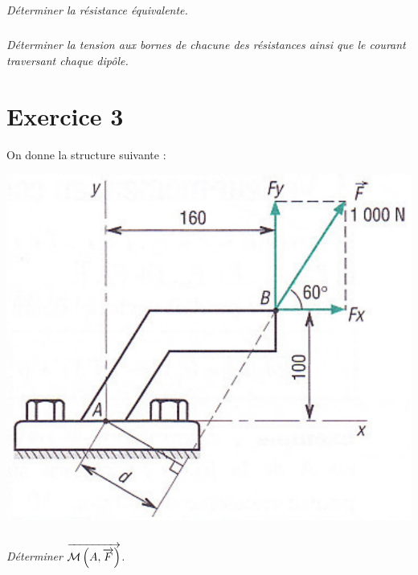 \documentclass[10pt,fleqn]{book} %
\begin{document}
\begin{multicols}{2}
\subparagraph{}
\textit{Déterminer la résistance équivalente.}

\subparagraph{}
\textit{Déterminer la tension aux bornes de chacune des résistances ainsi que le courant traversant chaque dipôle.}


\section*{Exercice 3}

\setcounter{subparagraph}{0}
On donne la structure suivante : 
\begin{center}
\includegraphics[width=.8\linewidth]{images/fig_04}
\end{center}


\subparagraph{}
\textit{Déterminer $\overrightarrow{\mathcal{M}\left(A,\overrightarrow{F} \right)}$.}




\end{multicols}
\end{document}
